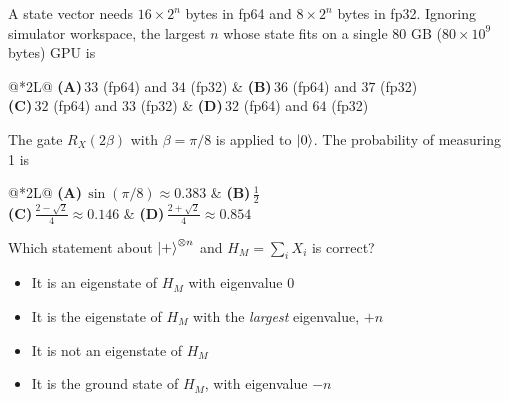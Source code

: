 \documentclass[11pt,a4paper]{article}
\newcommand{\optlabel}[1]{\textbf{(#1)}}
\newenvironment{qitem}[1]{\begin{list}{}{\setlength{\leftmargin}{3.3em}\setlength{\labelwidth}{3.1em}%
  \setlength{\labelsep}{0.2em}\setlength{\topsep}{3pt}\setlength{\parsep}{3pt}}\item[\textbf{Q.#1}\hfill]}{\end{list}}
\newcommand{\qsep}{\par\vspace{2pt}{\color{black!15}\hrule}\vspace{4pt}}
\begin{document}
\begin{qitem}{32}
A state vector needs $16 \times 2^n$ bytes in fp64 and $8\times 2^n$ bytes in fp32. Ignoring simulator workspace, the
largest $n$ whose state fits on a single 80 GB ($80\times10^9$ bytes) GPU is
\par\smallskip\noindent\begin{tabularx}{\linewidth}{@{}*{2}{L}@{}}
\optlabel{A}\,$33$ (fp64) and $34$ (fp32) & \optlabel{B}\,$36$ (fp64) and $37$ (fp32) \\[3pt]
\optlabel{C}\,$32$ (fp64) and $33$ (fp32) & \optlabel{D}\,$32$ (fp64) and $64$ (fp32)
\end{tabularx}
\end{qitem}
\qsep

\begin{qitem}{33}
The gate $R_X(2\beta)$ with $\beta = \pi/8$ is applied to $\ket0$. The probability of measuring 1 is
\par\smallskip\noindent\begin{tabularx}{\linewidth}{@{}*{2}{L}@{}}
\optlabel{A}\,$\sin(\pi/8) \approx 0.383$ & \optlabel{B}\,$\tfrac12$ \\[3pt]
\optlabel{C}\,$\tfrac{2 - \sqrt2}{4} \approx 0.146$ & \optlabel{D}\,$\tfrac{2 + \sqrt2}{4} \approx 0.854$
\end{tabularx}
\end{qitem}
\qsep

\begin{qitem}{34}
Which statement about $\ket{+}^{\otimes n}$ and $H_M = \sum_{i} X_i$ is correct?
\begin{itemize}[leftmargin=2.6em, labelsep=0.4em, itemsep=2pt, topsep=3pt]
\item[\optlabel{A}] It is an eigenstate of $H_M$ with eigenvalue $0$
\item[\optlabel{B}] It is the eigenstate of $H_M$ with the \emph{largest} eigenvalue, $+n$
\item[\optlabel{C}] It is not an eigenstate of $H_M$
\item[\optlabel{D}] It is the ground state of $H_M$, with eigenvalue $-n$
\end{itemize}
\end{qitem}
\qsep
\end{document}
